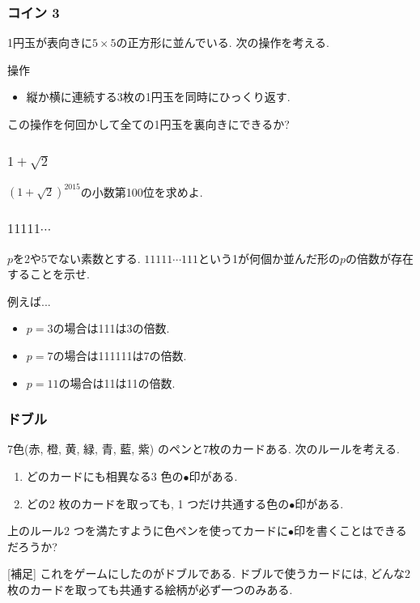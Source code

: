 \documentclass[11pt,dvipdfmx]{beamer}
\theoremstyle{definition}
\theoremstyle{remark}
\begin{document}
\begin{frame}
\frametitle{コイン 3}
1円玉が表向きに$5 \times 5$の正方形に並んでいる. 次の操作を考える. 
 \begin{block}{操作}
\begin{itemize}
\item 縦か横に連続する3枚の1円玉を同時にひっくり返す.
\end{itemize}
   \end{block}
 この操作を何回かして全ての1円玉を裏向きにできるか?
\end{frame}

\begin{frame}
\frametitle{$1 + \sqrt{2}$}
$(1 + \sqrt{2})^{2015}$の小数第100位を求めよ.
\end{frame}


\begin{frame}
\frametitle{$11111\cdots $}
$p$を2や5でない素数とする. 
$11111\cdots 111$という1が何個か並んだ形の$p$の倍数が存在することを示せ.

\vspace{20pt}
例えば...
\begin{itemize}
  \item $p=3$の場合は111は3の倍数.
  \item $p=7$の場合は111111は7の倍数.
  \item $p=11$の場合は11は11の倍数.
  \end{itemize}
\end{frame}


\begin{frame}
\frametitle{ドブル}
7色(赤, 橙, 黄, 緑, 青, 藍, 紫) のペンと7枚のカードある. 次のルールを考える.
\begin{enumerate}
    \setlength{\parskip}{0cm} 
  \setlength{\itemsep}{0cm} 
\item どのカードにも相異なる3 色の$\bullet$印がある.
\item どの2 枚のカードを取っても, 1 つだけ共通する色の$\bullet$印がある.
\end{enumerate}
上のルール2 つを満たすように色ペンを使ってカードに$\bullet$印を書くことはできるだろうか?

\vspace{20pt}
{\footnotesize
[補足] これをゲームにしたのがドブルである. ドブルで使うカードには, どんな2枚のカードを取っても共通する絵柄が必ず一つのみある. 
}

\end{frame}
\end{document}
